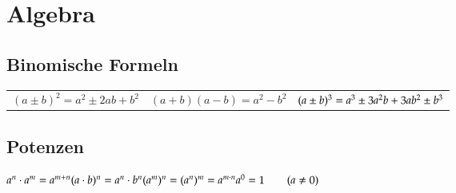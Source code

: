 \section{Algebra}
\subsection{Binomische Formeln}
\begin{table}[htb]
	\begin{tabular}{lll}
	$(a\pm b)^2=a^2\pm 2ab+b^2$ & $(a+b)(a-b)=a^2-b^2$ & $(a \pm b)^3 = a^3 \pm 3a^2 b + 3ab^2 \pm b^3  \newline
	$
	\end{tabular}
\end{table}
\subsection{Potenzen}
\begin{minipage}{0.5\linewidth}
	$
	a^n \cdot a^m = a^{m+n} \newline
	(a \cdot b)^n = a^n \cdot b^n \newline
	(a^m)^n = (a^n)^m = a^{m \cdot n}\newline
	a^0 = 1 \qquad (a \neq 0)\newline %
	$
\end{minipage}
